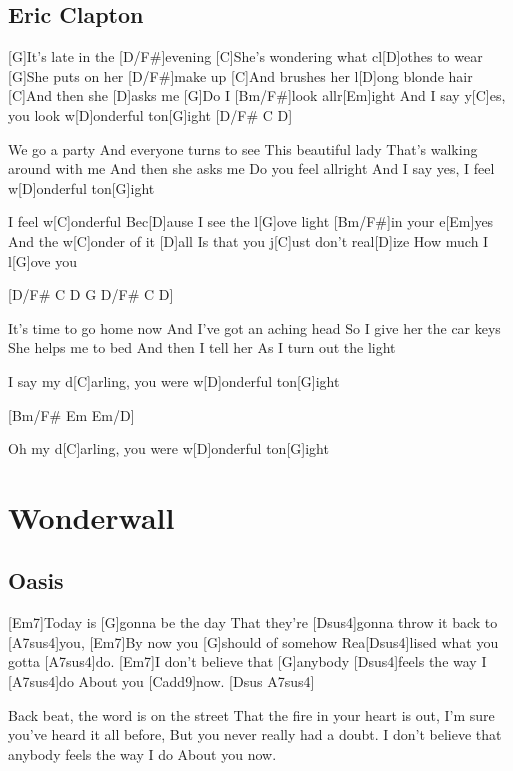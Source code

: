 \documentclass[a4paper,12pt]{article}
\begin{document}
\begin{multicols}{2}
\subsection*{Eric Clapton}
\begin{guitar}
[G  D/F#   C   D   G   D/F#   C   D]

[G]It's late in the [D/F#]evening
[C]She's wondering what cl[D]othes to wear
[G]She puts on her [D/F#]make up
[C]And brushes her l[D]ong blonde hair
[C]And then she [D]asks me
[G]Do I [Bm/F#]look allr[Em]ight
And I say y[C]es, 
you look w[D]onderful ton[G]ight [D/F#  C  D]


We go a party
And everyone turns to see
This beautiful lady
That's walking around with me
And then she asks me
Do you feel allright
And I say yes, I feel w[D]onderful ton[G]ight


I feel w[C]onderful
Bec[D]ause I see the l[G]ove light [Bm/F#]in your e[Em]yes
And the w[C]onder of it [D]all
Is that you j[C]ust don't real[D]ize
How much I l[G]ove you 


[D/F#  C  D  G  D/F#  C  D]


It's time to go home now
And I've got an aching head
So I give her the car keys
She helps me to bed
And then I tell her
As I turn out the light


I say my d[C]arling, 
you were w[D]onderful ton[G]ight 


[Bm/F#  Em Em/D]


Oh my d[C]arling, 
you were w[D]onderful ton[G]ight 

\end{guitar}
\section{Wonderwall}
\subsection*{Oasis}
\begin{guitar}

[Em7]Today is [G]gonna be the day 
That they're [Dsus4]gonna throw it back to [A7sus4]you, 
[Em7]By now you [G]should of somehow 
Rea[Dsus4]lised what you gotta [A7sus4]do. 
[Em7]I don't believe that [G]anybody 
[Dsus4]feels the way I [A7sus4]do 
About you [Cadd9]now. [Dsus A7sus4]


Back beat, the word is on the street 
That the fire in your heart is out, 
I'm sure you've heard it all before, 
But you never really had a doubt. 
I don't believe that anybody 
feels the way I do 
About you now. 



\end{guitar}
\end{multicols}
\end{document}
